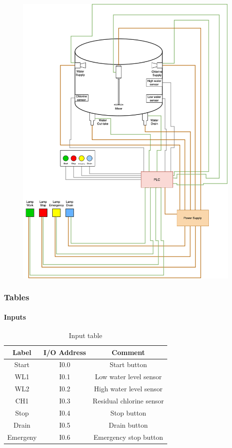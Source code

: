 \documentclass[12pt]{beamer}
\begin{document}
\begin{frame}
\begin{figure}
    \centering
    \includegraphics[trim={0 0 0 0}, clip, scale=.22]{img/Tank_draw.png}
    \label{fig:tank_draw}
\end{figure}
\end{frame}

\begin{frame}
\frametitle{Tables}
\framesubtitle{Inputs}
\begin{table}[]
    \centering
    \begin{tabular}{|c|c|c|}
        \hline
        Label & I/O Address & Comment \\
        \hline
        \hline
        Start & I0.0 & Start button\\
        \hline
        WL1 & I0.1 & Low water level sensor\\
        \hline
        WL2 & I0.2 & High water level sensor\\
        \hline
        CH1 & I0.3 & Residual chlorine sensor\\
        \hline
        Stop & I0.4 & Stop button\\
        \hline
        Drain & I0.5 & Drain button\\
        \hline
        Emergeny & I0.6 & Emergency stop button\\
        \hline
    \end{tabular}
    \caption{Input table}
    \label{tab:inputs}
\end{table}
\end{frame}
\end{document}
